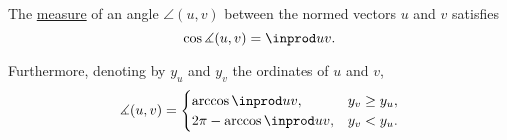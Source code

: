 \begin{proposition}\label{thm:cosine_of_angle_measure}
  The \hyperref[def:angle/measure]{measure} of an angle \( \angle(u, v) \) between the normed vectors \( u \) and \( v \) satisfies
  \begin{equation}\label{eq:thm:cosine_of_angle_measure/cos}
    \cos \measuredangle(u, v) = \inprod u v.
  \end{equation}

  Furthermore, denoting by \( y_u \) and \( y_v \) the ordinates of \( u \) and \( v \),
  \begin{equation}\label{eq:thm:cosine_of_angle_measure/arccos}
    \measuredangle(u, v) = \begin{cases}
      \arccos \inprod u v,        &y_v \geq y_u, \\
      2\pi - \arccos \inprod u v, &y_v < y_u.
    \end{cases}
  \end{equation}
\end{proposition}
